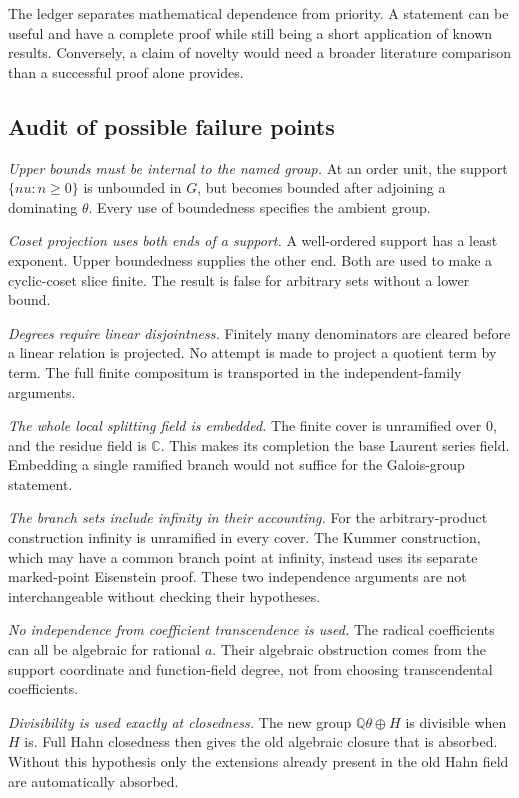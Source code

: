 \documentclass[11pt,letterpaper]{article}
\theoremstyle{definition}
\theoremstyle{remark}
\newcommand{\Q}{\mathbb Q}
\newcommand{\C}{\mathbb C}
\begin{document}
The ledger separates mathematical dependence from priority. A statement can
be useful and have a complete proof while still being a short application of
known results. Conversely, a claim of novelty would need a broader literature
comparison than a successful proof alone provides.

\subsection{Audit of possible failure points}\label{bst:gr:subsec:audit}

\emph{Upper bounds must be internal to the named group.} At an order unit,
the support $\{nu:n\geq0\}$ is unbounded in $G$, but becomes bounded after
adjoining a dominating $\theta$. Every use of boundedness specifies the
ambient group.

\emph{Coset projection uses both ends of a support.} A well-ordered support
has a least exponent. Upper boundedness supplies the other end. Both are used
to make a cyclic-coset slice finite. The result is false for arbitrary sets
without a lower bound.

\emph{Degrees require linear disjointness.} Finitely many denominators are
cleared before a linear relation is projected. No attempt is made to project
a quotient term by term. The full finite compositum is transported in the
independent-family arguments.

\emph{The whole local splitting field is embedded.} The finite cover is
unramified over $0$, and the residue field is $\C$. This makes its completion
the base Laurent series field. Embedding a single ramified branch would not
suffice for the Galois-group statement.

\emph{The branch sets include infinity in their accounting.} For the
arbitrary-product construction infinity is unramified in every cover. The
Kummer construction, which may have a common branch point at infinity,
instead uses its separate marked-point Eisenstein proof. These two
independence arguments are not interchangeable without checking their
hypotheses.

\emph{No independence from coefficient transcendence is used.} The radical
coefficients can all be algebraic for rational $a$. Their algebraic
obstruction comes from the support coordinate and function-field degree, not
from choosing transcendental coefficients.

\emph{Divisibility is used exactly at closedness.} The new group
$\Q\theta\oplus H$ is divisible when $H$ is. Full Hahn closedness then gives
the old algebraic closure that is absorbed. Without this hypothesis only the
extensions already present in the old Hahn field are automatically absorbed.
\end{document}
